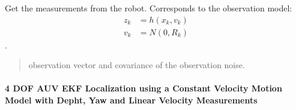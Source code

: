 \documentclass[letterpaper,10pt,english]{sphinxmanual}
\begin{document}
\begin{fulllineitems}
\begin{fulllineitems}
\begin{quote}
\begin{description}
\end{description}\end{quote}

\end{fulllineitems}


\begin{fulllineitems}
\label{\detokenize{GFLocalization:EKF_4DOFAUV_InputVelocityMM_DVLDepthYawOM.EKF_4DOFAUV_InputVelocityMM_DVLDepthYawOM.GetMeasurements}}
\pysigstartsignatures
{}
\pysigstopsignatures
\sphinxAtStartPar
Get the measurements from the robot. Corresponds to the observation model:
\begin{equation}\label{equation:GFLocalization:eq-h}
\begin{split}z_k &= h(x_{k},v_k) \\
v_k &= N(0,R_k)\end{split}
\end{equation}
\sphinxAtStartPar
{} .
\begin{quote}\begin{description}
\sphinxAtStartPar
observation vector and covariance of the observation noise.

\end{description}\end{quote}

\end{fulllineitems}


\end{fulllineitems}



\paragraph{4 DOF AUV EKF Localization using a Constant Velocity Motion Model with Depht, Yaw and Linear Velocity Measurements}
\label{\detokenize{GFLocalization:dof-auv-ekf-localization-using-a-constant-velocity-motion-model-with-depht-yaw-and-linear-velocity-measurements}}
\begin{figure}[htbp]
\centering

\noindent{}
\end{figure}
\end{document}
